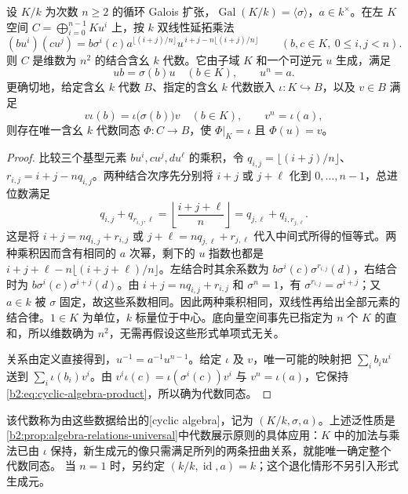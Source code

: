 \begin{proposition}\label{b2:prop:cyclic-algebra-construction}
	设 \(K/k\) 为次数 \(n\geq2\) 的循环 Galois 扩张，\(\operatorname{Gal}(K/k)=\langle\sigma\rangle\)，\(a\in k^\times\)。在左 \(K\) 空间 \(C=\bigoplus_{i=0}^{n-1}Ku^i\) 上，按 \(k\) 双线性延拓乘法
	\[
		(bu^i)(cu^j)=b\sigma^i(c)a^{\lfloor(i+j)/n\rfloor} u^{\,i+j-n\lfloor(i+j)/n\rfloor}\qquad(b,c\in K,\ 0\leq i,j<n).
	\]
	则 \(C\) 是维数为 \(n^2\) 的结合含幺 \(k\) 代数。它由子域 \(K\) 和一个可逆元 \(u\) 生成，满足
	\[
		ub=\sigma(b)u\quad(b\in K),\qquad u^n=a.
	\]
	更确切地，给定含幺 \(k\) 代数 \(B\)、指定的含幺 \(k\) 代数嵌入 \(\iota:K\hookrightarrow B\)，以及 \(v\in B\) 满足
	\[
		v\iota(b)=\iota\bigl(\sigma(b)\bigr)v\quad(b\in K),\qquad v^n=\iota(a),
	\]
	则存在唯一含幺 \(k\) 代数同态 \(\Phi:C\to B\)，使 \(\Phi|_K=\iota\) 且 \(\Phi(u)=v\)。
\end{proposition}
\begin{proof}
	比较三个基型元素 \(bu^i,cu^j,du^\ell\) 的乘积，令 \(q_{i,j}=\lfloor(i+j)/n\rfloor\)、\(r_{i,j}=i+j-nq_{i,j}\)。两种结合次序先分别将 \(i+j\) 或 \(j+\ell\) 化到 \(0,\ldots,n-1\)，总进位数满足
	\[
		q_{i,j}+q_{r_{i,j},\ell} =\left\lfloor\frac{i+j+\ell}{n}\right\rfloor =q_{j,\ell}+q_{i,r_{j,\ell}}.
	\]
	这是将 \(i+j=nq_{i,j}+r_{i,j}\) 或 \(j+\ell=nq_{j,\ell}+r_{j,\ell}\) 代入中间式所得的恒等式。两种乘积因而含有相同的 \(a\) 次幂，剩下的 \(u\) 指数也都是 \(i+j+\ell-n\lfloor(i+j+\ell)/n\rfloor\)。左结合时其余系数为 \(b\sigma^i(c)\sigma^{r_{i,j}}(d)\)，右结合时为 \(b\sigma^i(c)\sigma^{i+j}(d)\)。由 \(i+j=nq_{i,j}+r_{i,j}\) 和 \(\sigma^n=1\)，有 \(\sigma^{r_{i,j}}=\sigma^{i+j}\)；又 \(a\in k\) 被 \(\sigma\) 固定，故这些系数相同。因此两种乘积相同，双线性再给出全部元素的结合律。\(1\in K\) 为单位，\(k\) 标量位于中心。底向量空间事先已指定为 \(n\) 个 \(K\) 的直和，所以维数确为 \(n^2\)，无需再假设这些形式单项式无关。

	关系由定义直接得到，\(u^{-1}=a^{-1}u^{n-1}\)。给定 \(\iota\) 及 \(v\)，唯一可能的映射把 \(\sum_i b_i u^i\) 送到 \(\sum_i\iota(b_i)v^i\)。由 \(v^i\iota(c)=\iota(\sigma^i(c))v^i\) 与 \(v^n=\iota(a)\)，它保持\eqref{b2:eq:cyclic-algebra-product}，所以确为代数同态。
\end{proof}

该代数称为由这些数据给出的[cyclic algebra]，记为 \((K/k,\sigma,a)\)。上述泛性质是\cref{b2:prop:algebra-relations-universal}中代数展示原则的具体应用：\(K\) 中的加法与乘法已由 \(\iota\) 保持，新生成元的像只需满足所列的两条扭曲关系，就能唯一确定整个代数同态。
当 \(n=1\) 时，另约定 \((k/k,\operatorname{id},a)=k\)；这个退化情形不另引入形式生成元。

